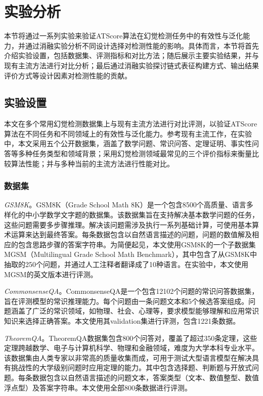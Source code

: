 \section{实验分析}

本节将通过一系列实验来验证ATScore算法在幻觉检测任务中的有效性与泛化能力，并通过消融实验分析不同设计选择对检测性能的影响。具体而言，本节将首先介绍实验设置，包括数据集、评测指标和对比方法；随后展示主要实验结果，并与现有主流方法进行对比分析；最后通过消融实验探讨链式表征构建方式、输出结果评价方式等设计因素对检测性能的贡献。

\subsection{实验设置}\label{subsec:experiment_settings}

本文在多个常用幻觉检测数据集上与现有主流方法进行对比评测，以验证ATScore算法在不同任务和不同领域上的有效性与泛化能力。参考现有主流工作\cite{wang2025latent,li2023inference}，在实验中，本文采用五个公开数据集，涵盖了数学问题、常识问答、定理证明、事实性问答等多种任务类型和领域背景；采用幻觉检测领域最常见的三个评价指标来衡量比较算法性能；并与多种当前的主流方法进行性能对比。

\subsubsection{数据集}

\emph{GSM8K}\cite{cobbe2021training}。GSM8K（Grade School Math 8K）是一个包含8500个高质量、语言多样化的中小学数学文字题的数据集。该数据集旨在支持解决基本数学问题的任务，这些问题需要多步骤推理。解决该问题需涉及执行一系列基础计算，可使用基本算术运算来达到最终答案。每条数据包含以自然语言描述的问题，问题的数值解及相应的包含思路步骤的答案字符串。为简便起见，本文使用GSM8K的一个子数据集MGSM（Multilingual Grade School Math Benchmark）\cite{shi2022language}，其中包含了从GSM8K中抽取的250个问题，并通过人工注释者翻译成了10种语言。在实验中，本文使用MGSM的英文版本进行评测。

\emph{CommonsenseQA}\cite{talmor2019commonsenseqa}。CommonsenseQA是一个包含12102个问题的常识问答数据集，旨在评测模型的常识推理能力。每个问题由一条问题文本和5个候选答案组成。问题涵盖了广泛的常识领域，如物理、社会、心理等，要求模型能够理解和应用常识知识来选择正确答案。本文使用其validation集进行评测，包含1221条数据。

\emph{TheoremQA}\cite{chen2023theoremqa}。TheoremQA数据集包含800个问答对，覆盖了超过350条定理，这些定理跨越数学、电子与计算机科学、物理和金融领域，难度为大学本科专业水平。该数据集由人类专家以非常高的质量收集而成，可用于测试大型语言模型在解决具有挑战性的大学级别问题时应用定理的能力。其中包含选择题、判断题与开放式问题。每条数据包含以自然语言描述的问题文本，答案类型（文本、数值整型、数值浮点型）及答案字符串。本文使用全部800条数据进行评测。

